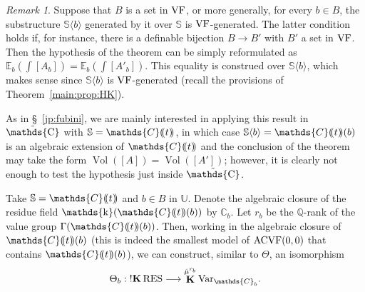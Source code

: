 \documentclass[12pt]{amsart}
\theoremstyle{plain}
\theoremstyle{definition}
\theoremstyle{remark}
\newtheorem{rem}[thm]{Remark}
\numberwithin{equation}{section}
\theoremstyle{plain}
\newcommand{\VF}{\textup{VF}}
\newcommand{\ACVF}{\textup{ACVF}}
\DeclareMathOperator{\K}{\mathds{k}}
\newcommand{\C}{\mathds{C}}
\newcommand{\Q}{\mathds{Q}}
\newcommand{\0}{\emptyset}
\newcommand{\dpar}[1]{%
   (\mkern-4mu (#1 )\mkern-4mu )}
\newcommand{\bb}[1]{\mathbb{#1}}
\newcommand{\fun}{\longrightarrow}
\newcommand{\la}{\langle}
\newcommand{\ra}{\rangle}
\newcommand{\RES}{\textup{RES}}
\DeclareMathOperator{\ggk}{\mathbf{K}}
\DeclareMathOperator{\sggk}{!\mathbf{K}}
\newcommand{\var}{\textup{Var}}
\DeclareMathOperator{\puC}{\tilde \C}
\DeclareMathOperator{\Vol}{Vol}
\begin{document}
\begin{rem}\label{rem:volb}
Suppose that $B$ is a set in $\VF$, or more generally, for every $b \in B$, the substructure $\bb S \la b \ra$ generated by it over $\bb S$ is $\VF$-generated. The latter condition holds if, for instance, there is a definable bijection $B \fun B'$ with $B'$ a set in $\VF$. Then the hypothesis of the theorem can be simply reformulated as $\bb E_b (\int [A_b]) = \bb E_b ( \int [A'_b])$. This equality is construed over  $\bb S \la b \ra$, which makes sense since $\bb S \la b \ra$ is $\VF$-generated (recall the provisions of Theorem~\ref{main:prop:HK}).

As in \S~\ref{jp:fubini}, we are mainly interested in applying this result in $\puC$ with $\bb S = \C \dpar{ t }$, in which case $\bb S\la b \ra = \C \dpar{ t }(b)$ is an algebraic extension of $\C \dpar{ t }$ and the conclusion of the theorem  may take the form $\Vol([A]) = \Vol([A'])$; however,  it is clearly not enough to test the hypothesis just inside $\puC$.

Take $\bb S = \C \dpar{ t }$  and $b \in B$ in $\bb U$. Denote the algebraic closure of the residue field $\K(\C \dpar{ t }( b ))$ by $\C_b$. Let $r_b$  be the $\Q$-rank of the value group $\Gamma(\C \dpar{ t }( b ))$. Then, working in the algebraic closure of $\C \dpar{ t }( b )$ (this is indeed the smallest model of $\ACVF(0, 0)$ that contains $\C \dpar{ t }( b )$), we can construct, similar to $\Theta$, an isomorphism
\[
\Theta_b:  \sggk \RES \fun \ggk^{{\hat \mu}^{r_b}}\var_{\C_b}.
\]


\end{rem}
\end{document}

